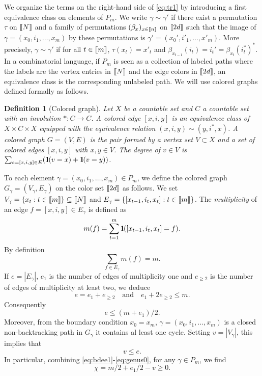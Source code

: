 \documentclass[11pt]{article}
\newtheorem{definition}[lemma]{Definition}
\newcommand{\AND}{\quad \mathrm{and} \quad}
\newcommand{\1}{1\!\!{\sf I}}
\newcommand{\IND}{\1}
\newcommand{\INT}[1]{{{\left[\hspace{-1.4pt}\left[#1\right]\hspace{-1.4pt}\right]}}}
\begin{document}
We organize the terms on the right-hand side of \eqref{eq:tr1} by introducing a first equivalence class on elements of 
$P_{m}$. 
We write $\gamma \sim \gamma'$ if there exist a permutation $\tau$ on $\INT{N}$ and a family of permutations $(\beta_x)_{x \in \INT{n}}$ on $\INT{2d}$ such that the image of $\gamma = (x_{0},i_{1},\ldots,x_m)$ by these permutations is $\gamma' = (x_{0}',i'_{1},\ldots, x'_m)$. More precisely, $\gamma \sim \gamma'$ if for all $t \in \INT{m}$, $\tau(x_t) = x'_t$ and $\beta_{x_{t-1}}(i_{t}) = i_t' = \beta_{x_{t}} (i_t^*)^*$.  
In a combinatorial language, if 
$P_{m}$ is seen as a collection of labeled paths where the labels are the vertex entries in $\INT{N}$ and the edge colors in $\INT{2d}$, an equivalence class is the corresponding unlabeled path.
We will use colored graphs defined formally as follows. 

\begin{definition}[Colored graph]\label{def:colorgraph}
Let $X$ be a countable set and $C$ a countable set with an involution $* : C \to C$. A {\em colored edge} $[x,i,y]  $ is an equivalence 
class of $X \times C \times X$ equipped with the equivalence relation $(x,i,y) \sim (y,i^*,x)$. A {\em colored graph} $G = (V,E)$ is the 
pair formed by a vertex set $V \subset X$ and a set of colored edges $[x,i,y]$ with $x,y \in V$. The {\em degree} of $v \in V$ is
 $\sum_{e = [x,i,y] \in E}  ( \IND ( v = x )  + \IND ( v = y) )$.
\end{definition}

To each element $\gamma  = (x_{0},i_{1},\ldots,x_m) \in P_{m}$, we define the colored graph $G_\gamma = (V_\gamma,E_\gamma)$ on the color set $\INT{2d}$ as follows. We set $V_\gamma = \{ x_{t} : t \in \INT{m} \} \subseteq \INT{N}$ and 
$E_\gamma = \{ [ x_{t-1} ,i_t, x_{t}] :   t \in \INT{m}\}$. 
The {\em multiplicity} of an edge $f = [x,i,y] \in E_\gamma$ is defined as 
$$
m(f) = \sum_{t= 1}^m \IND (  [ x_{t-1} ,i_t, x_{t}] = f ).
$$
By definition
$$
\sum_{f \in E_\gamma} m(f) = m.
$$
If  $e = |E_\gamma|$, $e_1$ is the number of edges of multiplicity one and $e_{\geq 2}$ is the number of edges of multiplicity 
at least two, we deduce
$$
e = e_1 + e_{\geq 2} \AND e_1 + 2 e_{\geq 2} \leq m . 
$$
Consequently
\begin{equation}\label{eq:bdee1}
e \leq (m + e_1 )/2. 
\end{equation}
Moreover, from the boundary condition $x_0 = x_m$, $\gamma = (x_0,i_1, \ldots,x_m)$ is a closed non-backtracking path in $G_\gamma$ it contains al least one cycle.  Setting $v =|V_\gamma|$, this implies that
\begin{equation}\label{eq:genus0}
v \leq e.
\end{equation}
In particular, combining \eqref{eq:bdee1}-\eqref{eq:genus0}, for any $\gamma \in P_{m}$, we find
\begin{equation}\label{eq:genus}
\chi = m/2 + e_1/2 - v \geq 0.
\end{equation}
\end{document}
